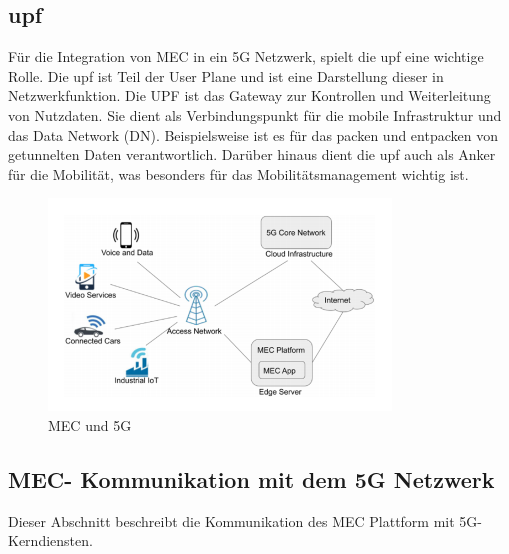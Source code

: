 \documentclass[runningheads]{llncs}
\numberwithin{figure}{section}
\begin{document}
\subsection{\acrfull{upf}}
Für die Integration von MEC in ein 5G Netzwerk, spielt die \acrfull{upf} eine wichtige Rolle. Die \acrshort{upf} ist Teil der User Plane
und ist eine Darstellung dieser in Netzwerkfunktion. Die UPF ist das Gateway zur Kontrollen und Weiterleitung von Nutzdaten. 
Sie dient als Verbindungspunkt für die mobile Infrastruktur und das Data Network (DN). Beispielsweise ist es für das packen und entpacken von 
getunnelten Daten verantwortlich. Darüber hinaus dient die \acrshort{upf} auch als Anker für die Mobilität, was besonders für das Mobilitätsmanagement wichtig ist.
\cite{Leitfaden5GCampusnetze2020}
\begin{figure}
  \includegraphics[width=\linewidth]{images/mec-and-5g.png}
  \caption{MEC und 5G}
  \label{fig:mec-and-5g}
\end{figure}

\subsection{MEC- Kommunikation mit dem 5G Netzwerk}
Dieser Abschnitt beschreibt die Kommunikation des MEC
Plattform mit 5G-Kerndiensten.
\end{document}
